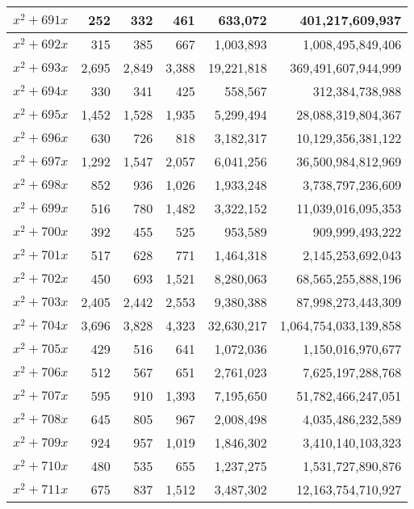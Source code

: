 \documentclass[a4paper]{amsproc}
\theoremstyle{plain}
\theoremstyle{named}
\begin{document}
\begin{longtable}{ | l | r | r | r | r | r | }
$x^2 + 691x$ & 252 & 332 & 461 & 633{,}072 & 401{,}217{,}609{,}937 \\ \hline
$x^2 + 692x$ & 315 & 385 & 667 & 1{,}003{,}893 & 1{,}008{,}495{,}849{,}406 \\ \hline
$x^2 + 693x$ & 2{,}695 & 2{,}849 & 3{,}388 & 19{,}221{,}818 & 369{,}491{,}607{,}944{,}999 \\ \hline
$x^2 + 694x$ & 330 & 341 & 425 & 558{,}567 & 312{,}384{,}738{,}988 \\ \hline
$x^2 + 695x$ & 1{,}452 & 1{,}528 & 1{,}935 & 5{,}299{,}494 & 28{,}088{,}319{,}804{,}367 \\ \hline
$x^2 + 696x$ & 630 & 726 & 818 & 3{,}182{,}317 & 10{,}129{,}356{,}381{,}122 \\ \hline
$x^2 + 697x$ & 1{,}292 & 1{,}547 & 2{,}057 & 6{,}041{,}256 & 36{,}500{,}984{,}812{,}969 \\ \hline
$x^2 + 698x$ & 852 & 936 & 1{,}026 & 1{,}933{,}248 & 3{,}738{,}797{,}236{,}609 \\ \hline
$x^2 + 699x$ & 516 & 780 & 1{,}482 & 3{,}322{,}152 & 11{,}039{,}016{,}095{,}353 \\ \hline
$x^2 + 700x$ & 392 & 455 & 525 & 953{,}589 & 909{,}999{,}493{,}222 \\ \hline
$x^2 + 701x$ & 517 & 628 & 771 & 1{,}464{,}318 & 2{,}145{,}253{,}692{,}043 \\ \hline
$x^2 + 702x$ & 450 & 693 & 1{,}521 & 8{,}280{,}063 & 68{,}565{,}255{,}888{,}196 \\ \hline
$x^2 + 703x$ & 2{,}405 & 2{,}442 & 2{,}553 & 9{,}380{,}388 & 87{,}998{,}273{,}443{,}309 \\ \hline
$x^2 + 704x$ & 3{,}696 & 3{,}828 & 4{,}323 & 32{,}630{,}217 & 1{,}064{,}754{,}033{,}139{,}858 \\ \hline
$x^2 + 705x$ & 429 & 516 & 641 & 1{,}072{,}036 & 1{,}150{,}016{,}970{,}677 \\ \hline
$x^2 + 706x$ & 512 & 567 & 651 & 2{,}761{,}023 & 7{,}625{,}197{,}288{,}768 \\ \hline
$x^2 + 707x$ & 595 & 910 & 1{,}393 & 7{,}195{,}650 & 51{,}782{,}466{,}247{,}051 \\ \hline
$x^2 + 708x$ & 645 & 805 & 967 & 2{,}008{,}498 & 4{,}035{,}486{,}232{,}589 \\ \hline
$x^2 + 709x$ & 924 & 957 & 1{,}019 & 1{,}846{,}302 & 3{,}410{,}140{,}103{,}323 \\ \hline
$x^2 + 710x$ & 480 & 535 & 655 & 1{,}237{,}275 & 1{,}531{,}727{,}890{,}876 \\ \hline
$x^2 + 711x$ & 675 & 837 & 1{,}512 & 3{,}487{,}302 & 12{,}163{,}754{,}710{,}927 \\ \hline

\end{longtable}
\end{document}

